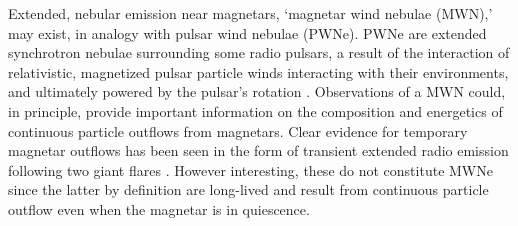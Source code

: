 
Extended, nebular emission near magnetars, `magnetar
wind nebulae (MWN),' may exist, in analogy with pulsar wind nebulae (PWNe).
PWNe are extended synchrotron
nebulae surrounding some radio pulsars, a result of the interaction of relativistic,
magnetized pulsar particle winds interacting with their environments, and
ultimately powered by the pulsar's rotation \citep[see][for
a review]{gs06}.  Observations
of a MWN could, in principle, provide important information on the
composition and energetics of continuous particle outflows from magnetars.
Clear evidence for temporary magnetar outflows has been seen in the form of transient extended radio emission following two giant flares \citep{fkb99,gkg+05,gle+05}.
However interesting, these do not constitute MWNe since the latter by definition are long-lived and result
from continuous particle outflow even when the magnetar is in quiescence.

